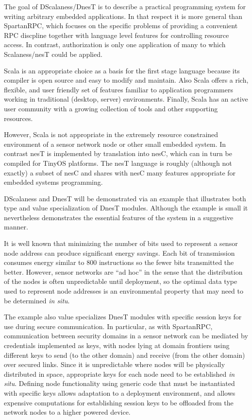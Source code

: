 The goal of DScalaness/DnesT is to describe a practical programming system for writing arbitrary
embedded applications. In that respect it is more general than SpartanRPC, which focuses on the
specific problems of providing a convenient RPC discpline together with language level features
for controlling resource access. In contrast, authorization is only one application of many to
which Scalaness/nesT could be applied.

Scala is an appropriate choice as a basis for the first stage language because its compiler is
open source and easy to modify and maintain. Also Scala offers a rich, flexible, and user
friendly set of features familiar to application programmers working in traditional (desktop,
server) environments. Finally, Scala has an active user community with a growing collection of
tools and other supporting resources.

However, Scala is not appropriate in the extremely resource constrained environment of a sensor
network node or other small embedded system. In contrast nesT is implemented by translation into
nesC, which can in turn be compiled for TinyOS platforms. The nesT language is roughly (although
not exactly) a subset of nesC and shares with nesC many features appropriate for embedded
systems programming.

DScalaness and DnesT will be demonstrated via an example that illustrates both type and value
specialization of DnesT modules. Although the example is small it nevertheless demonstrates the
essential features of the system in a suggestive manner.

It is well known that minimizing the number of bits used to represent a sensor node address can
produce significant energy savings. Each bit of transmission consumes energy similar to 800
instructions \cite{tag} so the fewer bits transmitted the better. However, sensor networks are
``ad hoc'' in the sense that the distribution of the nodes is often unpredictable until
deployment, so the optimal data type used to represent node addresses is an environmental
property that may need to be determined \emph{in situ}.

The example also value specializes DnesT modules with specific session keys for use during
secure communication. In particular, as with SpartanRPC, communication between security domains
in a sensor network can be mediated by credentials implemented as keys, with nodes lying at
domain frontiers using different keys to send (to the other domain) and receive (from the other
domain) over secured links. Since it is unpredictable where nodes will be physically distributed
in space, appropriate keys for each node need to be established \emph{in situ}. Defining node
functionality using generic code that must be instantiated with specific keys allows adaptation
to a deployment environment, and allows expensive computations for establishing session keys to
be offloaded from the network nodes to a higher powered device.

